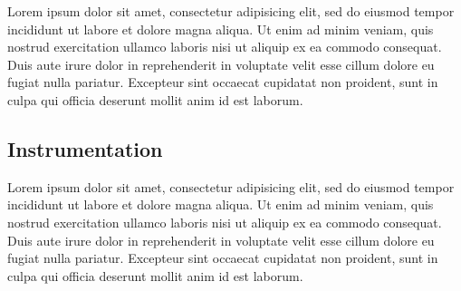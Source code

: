 Lorem ipsum dolor sit amet, consectetur adipisicing elit, sed do eiusmod tempor incididunt ut labore et dolore magna aliqua. Ut enim ad minim veniam, quis nostrud exercitation ullamco laboris nisi ut aliquip ex ea commodo consequat. Duis aute irure dolor in reprehenderit in voluptate velit esse cillum dolore eu fugiat nulla pariatur. Excepteur sint occaecat cupidatat non proident, sunt in culpa qui officia deserunt mollit anim id est laborum.



\subsection{Instrumentation}

Lorem ipsum dolor sit amet, consectetur adipisicing elit, sed do eiusmod tempor incididunt ut labore et dolore magna aliqua. Ut enim ad minim veniam, quis nostrud exercitation ullamco laboris nisi ut aliquip ex ea commodo consequat. Duis aute irure dolor in reprehenderit in voluptate velit esse cillum dolore eu fugiat nulla pariatur. Excepteur sint occaecat cupidatat non proident, sunt in culpa qui officia deserunt mollit anim id est laborum.
